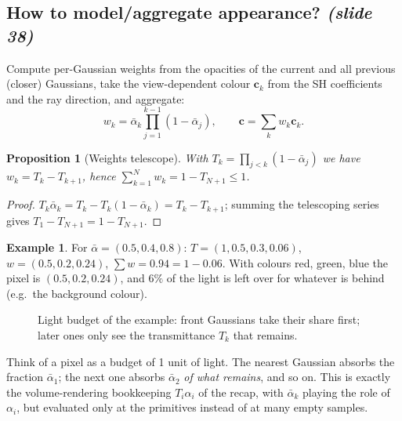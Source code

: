 \documentclass[11pt,a4paper]{article}
\newcommand{\abar}{\bar\alpha}
\newcommand{\sr}[1]{\texorpdfstring{\emph{(#1)}}{(#1)}}
\theoremstyle{definition}
\newtheorem{example}[definition]{Example}
\theoremstyle{algstyle}
\theoremstyle{plain}
\newtheorem{proposition}[definition]{Proposition}
\theoremstyle{remark}
\begin{document}
\subsection{How to model/aggregate appearance? \sr{slide 38}}
Compute per-Gaussian weights from the opacities of the current and all previous (closer) Gaussians, take the view-dependent colour $\bm c_k$ from the SH coefficients and the ray direction, and aggregate:
\[
w_k=\abar_k\prod_{j=1}^{k-1}(1-\abar_j),\qquad\bm c=\sum_kw_k\bm c_k.
\]

\begin{proposition}[Weights telescope]\label{prop:telescope}
With $T_k=\prod_{j<k}(1-\abar_j)$ we have $w_k=T_k-T_{k+1}$, hence $\sum_{k=1}^Nw_k=1-T_{N+1}\le1$.
\end{proposition}
\begin{proof}
$T_k\abar_k=T_k-T_k(1-\abar_k)=T_k-T_{k+1}$; summing the telescoping series gives $T_1-T_{N+1}=1-T_{N+1}$.
\end{proof}

\begin{example}
For $\abar=(0.5,0.4,0.8)$: $T=(1,0.5,0.3,0.06)$, $w=(0.5,0.2,0.24)$, $\sum w=0.94=1-0.06$. With colours red, green, blue the pixel is $(0.5,0.2,0.24)$, and $6\%$ of the light is left over for whatever is behind (e.g.\ the background colour).
\end{example}

\begin{figure}[htbp]
\centering
{}
\caption{Light budget of the example: front Gaussians take their share first; later ones only see the transmittance $T_k$ that remains.}
\end{figure}

\begin{intuition}
Think of a pixel as a budget of 1 unit of light. The nearest Gaussian absorbs the fraction $\abar_1$; the next one absorbs $\abar_2$ \emph{of what remains}, and so on. This is exactly the volume-rendering bookkeeping $T_i\alpha_i$ of the recap, with $\abar_k$ playing the role of $\alpha_i$, but evaluated only at the primitives instead of at many empty samples.
\end{intuition}
\end{document}
